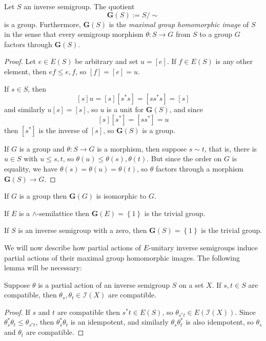 \begin{proposition}[{\cite[Proposition~2.1.2]{MR1724106}}]
Let $S$ an inverse semigroup. The quotient 
\[\mathbf{G}(S):=S/{\sim}\]
is a group. Furthermore, $\mathbf{G}(S)$ is the \emph{maximal group homomorphic image} of $S$ in the sense that every semigroup morphism $\theta: S \rightarrow G$ from $S$ to a group $G$ factors through $\mathbf{G}(S)$.
\end{proposition}
\begin{proof}
Let $e\in E(S)$ be arbitrary and set $u=[e]$. If $f\in E(S)$ is any other element, then $ef\leq e,f$, so $[f]=[e]=u$.

If $s\in S$, then
\[[s]u=[s][s^*s]=[ss^*s]=[s]\]
and similarly $u[s]=[s]$, so $u$ is a unit for $\mathbf{G}(S)$, and since
\[[s][s^*]=[ss^*]=u\]
then $[s^*]$ is the inverse of $[s]$, so $\mathbf{G}(S)$ is a group.

If $G$ is a group and $\theta:S\to G$ is a morphism, then suppose $s\sim t$, that is, there is $u\in S$ with $u\leq s,t$, so $\theta(u)\leq\theta(s),\theta(t)$. But since the order on $G$ is equality, we have $\theta(s)=\theta(u)=\theta(t)$, so $\theta$ factors through a morphism $\mathbf{G}(S)\to G$.\qedhere
\end{proof}

\begin{example}
If $G$ is a group then $\mathbf{G}(G)$ is isomorphic to $G$.
\end{example}

\begin{example}
If $E$ is a $\land$-semilattice then $\mathbf{G}(E)=\left\{1\right\}$ is the trivial group.
\end{example}

\begin{example}
If $S$ is an inverse semigroup with a zero, then $\mathbf{G}(S)=\left\{1\right\}$ is the trivial group.
\end{example}

We will now describe how partial actions of $E$-unitary inverse semigroups induce partial actions of their maximal group homomorphic images. The following lemma will be necessary:

\begin{lemma}\label{lemmacompatibilitypartialaction}
Suppose $\theta$ is a  partial action of an inverse semigroup $S$ on a set $X$. If $s,t\in S$ are compatible, then $\theta_s,\theta_t\in\mathcal{I}(X)$ are compatible.
\end{lemma}
\begin{proof}
If $s$ and $t$ are compatible then $s^*t\in E(S)$, so $\theta_{s^*t}\in E(\mathcal{I}(X))$. Since $\theta_s^*\theta_t\leq \theta_{s^*t}$, then $\theta_s^*\theta_t$ is an idempotent, and similarly $\theta_s\theta_t^*$ is also idempotent, so $\theta_s$ and $\theta_t$ are compatible.
\end{proof}

